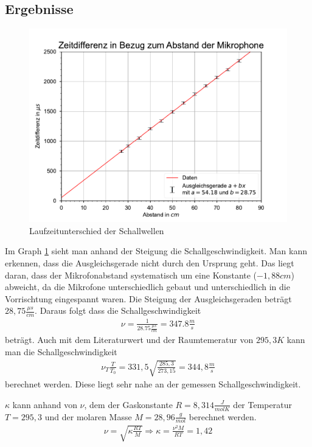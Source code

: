 \documentclass[11pt, a4paper]{article}
\begin{document}
    \subsection{Ergebnisse}
    \begin{figure}[h]
        
        \includegraphics{./2Mikros.pdf}

        \caption{Laufzeitunterschied der Schallwellen}
        \label{fig:graph2}
    \end{figure}
    Im Graph \ref{fig:graph2} sieht man anhand der Steigung die Schallgeschwindigkeit. Man kann erkennen, dass die Ausgleichsgerade nicht durch den Ursprung geht. Das liegt daran,
    dass der Mikrofonabstand systematisch um eine Konstante ($-1,88cm$) abweicht, da die Mikrofone unterschiedlich gebaut und unterschiedlich in die 
    Vorrischtung eingespannt waren. Die Steigung der Ausgleichsgeraden beträgt $28,75\frac{\mu s}{cm}$. Daraus folgt
    dass die Schallgeschwindigkeit
    \begin{align} \label{sch1}
        \nu = \frac{1}{28.75\frac{\mu s}{cm}} = 347.8\frac{m}{s}
    \end{align}
    beträgt. Auch mit dem Literaturwert und der Raumtemeratur von $295,3K$ kann man die Schallgeschwindigkeit
    \begin{align} \label{sch2}
        \nu_T\frac{T}{T_0} = 331,5 \sqrt{\frac{285,3}{273,15}} = 344,8\frac{m}{s}
    \end{align}
    berechnet werden. Diese liegt sehr nahe an der gemessen Schallgeschwindigkeit.

    $\kappa$ kann anhand von $\nu$, dem der Gaskonstante $R = 8,314 \frac{J}{molK}$ der Temperatur $T=295,3$ und der molaren Masse $M=28,96\frac{g}{mol}$ berechnet werden.
    \begin{align}
        \nu = \sqrt{\kappa \frac{RT}{M}} \Rightarrow \kappa = \frac{\nu^2 M}{RT}=1,42
    \end{align}
\end{document}

